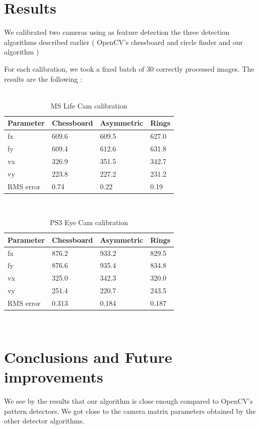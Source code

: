 \documentclass[journal]{IEEEtran}
\begin{document}
\section{Results}
We calibrated two cameras using as feature detection the three detection algorithms described earlier ( OpenCV's chessboard and circle finder and our algorithm )

For each calibration, we took a fixed batch of 30 correctly processed images. The results are the following :
\\
\\
\begin{table}[H]
\begin{tabular}{ |p{2cm}||p{2cm}|p{2cm}|p{2cm}|  }
 \hline
 Parameter & Chessboard & Asymmetric & Rings \\
 \hline
 fx        & 609.6& 609.5& 627.0\\
 fy        & 609.4& 612.6& 631.8\\
 vx        & 326.9& 351.5& 342.7\\
 vy 	   & 223.8& 227.2& 231.2\\
 RMS error & 0.74 & 0.22 & 0.19\\
 \hline
\end{tabular}
\\
\caption{MS Life Cam calibration}
\end{table}

\begin{table}[H]
\begin{tabular}{ |p{2cm}||p{2cm}|p{2cm}|p{2cm}|  }
 \hline
 Parameter & Chessboard & Asymmetric & Rings \\
 \hline
 fx        & 876.2& 933.2& 829.5\\
 fy        & 876.6& 935.4& 834.8\\
 vx        & 325.0& 342.3& 320.0\\
 vy 	   & 251.4& 220.7& 243.5\\
 RMS error & 0.313& 0.184& 0.187\\
 \hline
\end{tabular}
\\
\caption{PS3 Eye Cam calibration}
\end{table}

\section{Conclusions and Future improvements}
We see by the results that our algorithm is close enough compared to OpenCV's pattern detectors. We got close to the camera matrix parameters obtained by the other detector algorithms.
\end{document}
